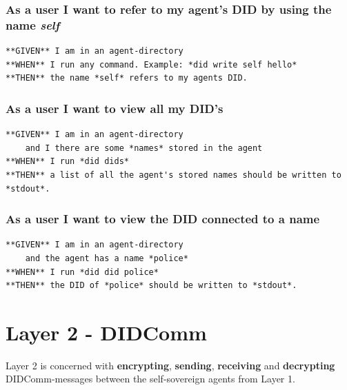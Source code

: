 \hypertarget{as-a-user-i-want-to-refer-to-my-agents-did-by-using-the-name-self}{%
\subsubsection{\texorpdfstring{As a user I want to refer to my agent's
DID by using the name
\emph{self}}{As a user I want to refer to my agent's DID by using the name self}}\label{as-a-user-i-want-to-refer-to-my-agents-did-by-using-the-name-self}}

\begin{lstlisting}
**GIVEN** I am in an agent-directory
**WHEN** I run any command. Example: *did write self hello*
**THEN** the name *self* refers to my agents DID.
\end{lstlisting}

\hypertarget{as-a-user-i-want-to-view-all-my-dids}{%
\subsubsection{As a user I want to view all my
DID's}\label{as-a-user-i-want-to-view-all-my-dids}}

\begin{lstlisting}
**GIVEN** I am in an agent-directory
    and I there are some *names* stored in the agent
**WHEN** I run *did dids*
**THEN** a list of all the agent's stored names should be written to *stdout*.
\end{lstlisting}

\hypertarget{as-a-user-i-want-to-view-the-did-connected-to-a-name}{%
\subsubsection{As a user I want to view the DID connected to a
name}\label{as-a-user-i-want-to-view-the-did-connected-to-a-name}}

\begin{lstlisting}
**GIVEN** I am in an agent-directory
    and the agent has a name *police*
**WHEN** I run *did did police*
**THEN** the DID of *police* should be written to *stdout*.
\end{lstlisting}

\hypertarget{layer-2---didcomm}{%
\section{Layer 2 - DIDComm}\label{layer-2---didcomm}}

Layer 2 is concerned with \textbf{encrypting}, \textbf{sending},
\textbf{receiving} and \textbf{decrypting} DIDComm-messages between the
self-sovereign agents from Layer 1.

